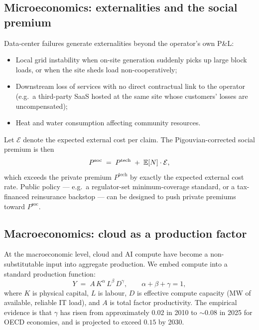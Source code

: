 \subsection{Microeconomics: externalities and the social premium}\label{ss:ext}

Data-center failures generate externalities beyond the operator's own
P\&L:
\begin{itemize}[leftmargin=*,nosep]
   \item Local grid instability when on-site generation suddenly picks
         up large block loads, or when the site sheds load
         non-cooperatively;
   \item Downstream loss of services with no direct contractual link
         to the operator (e.g.\ a third-party SaaS hosted at the same
         site whose customers' losses are uncompensated);
   \item Heat and water consumption affecting community resources.
\end{itemize}
Let $\mathcal{E}$ denote the expected external cost per claim. The
Pigouvian-corrected social premium is then
\begin{equation}\label{eq:pigou}
   P^{\mathrm{soc}} \;=\; P^{\mathrm{tech}} \;+\; \mathbb{E}[N]\cdot \mathcal{E},
\end{equation}
which exceeds the private premium $P^{\mathrm{tech}}$ by exactly the
expected external cost rate. Public policy --- e.g.\ a regulator-set
minimum-coverage standard, or a tax-financed reinsurance backstop ---
can be designed to push private premiums toward $P^{\mathrm{soc}}$.

\subsection{Macroeconomics: cloud as a production factor}\label{ss:macro-prod}

At the macroeconomic level, cloud and AI compute have become a
non-substitutable input into aggregate production. We embed compute
into a standard production function:
\begin{equation}\label{eq:prod}
   Y \;=\; A\, K^{\alpha}\, L^{\beta}\, D^{\gamma},
   \qquad \alpha+\beta+\gamma=1,
\end{equation}
where $K$ is physical capital, $L$ is labour, $D$ is effective compute
capacity (\si{\mega\watt} of available, reliable IT load), and $A$
is total factor productivity. The empirical evidence is that
$\gamma$ has risen from approximately $0.02$ in 2010 to $\sim 0.08$ in
2025 for OECD economies, and is projected to exceed $0.15$ by 2030.

